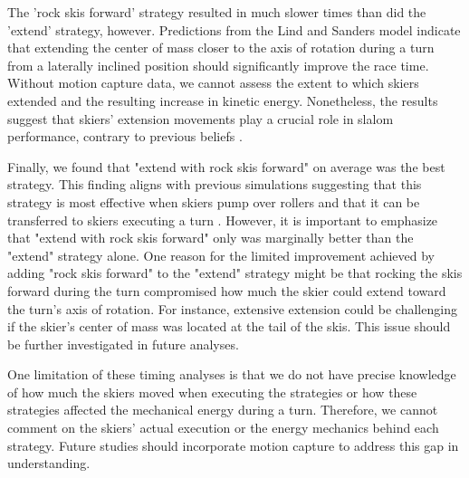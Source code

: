 The 'rock skis forward' strategy resulted in much slower times than did the 'extend' strategy, however. Predictions from the Lind and Sanders model \cite{lind_physics_2013} indicate that extending the center of mass closer to the axis of rotation during a turn from a laterally inclined position should significantly improve the race time. Without motion capture data, we cannot assess the extent to which skiers extended and the resulting increase in kinetic energy. Nonetheless, the results suggest that skiers' extension movements play a crucial role in slalom performance, contrary to previous beliefs \cite{supej_differential_2008, supej_doba_2001}.

Finally, we found that "extend with rock skis forward" on average was the best strategy. This finding aligns with previous simulations suggesting that this strategy is most effective when skiers pump over rollers \cite{mote_accelerations_1983} and that it can be transferred to skiers executing a turn \cite{reid_kinematic_2010}. However, it is important to emphasize that "extend with rock skis forward" only was marginally better than the "extend" strategy alone. One reason for the limited improvement achieved by adding "rock skis forward" to the "extend" strategy might be that rocking the skis forward during the turn compromised how much the skier could extend toward the turn's axis of rotation. For instance, extensive extension could be challenging if the skier's center of mass was located at the tail of the skis. This issue should be further investigated in future analyses.

One limitation of these timing analyses is that we do not have precise knowledge of how much the skiers moved when executing the strategies or how these strategies affected the mechanical energy during a turn. Therefore, we cannot comment on the skiers' actual execution or the energy mechanics behind each strategy. Future studies should incorporate motion capture to address this gap in understanding.


